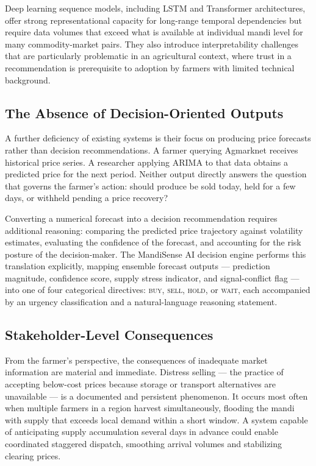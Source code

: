 \documentclass[12pt,a4paper]{report}
\begin{document}
Deep learning sequence models, including LSTM and Transformer architectures, offer strong representational capacity for long-range temporal dependencies but require data volumes that exceed what is available at individual mandi level for many commodity-market pairs. They also introduce interpretability challenges that are particularly problematic in an agricultural context, where trust in a recommendation is prerequisite to adoption by farmers with limited technical background.

\subsection{The Absence of Decision-Oriented Outputs}

A further deficiency of existing systems is their focus on producing price forecasts rather than decision recommendations. A farmer querying Agmarknet receives historical price series. A researcher applying ARIMA to that data obtains a predicted price for the next period. Neither output directly answers the question that governs the farmer's action: should produce be sold today, held for a few days, or withheld pending a price recovery?

Converting a numerical forecast into a decision recommendation requires additional reasoning: comparing the predicted price trajectory against volatility estimates, evaluating the confidence of the forecast, and accounting for the risk posture of the decision-maker. The MandiSense AI decision engine performs this translation explicitly, mapping ensemble forecast outputs — prediction magnitude, confidence score, supply stress indicator, and signal-conflict flag — into one of four categorical directives: \textsc{buy}, \textsc{sell}, \textsc{hold}, or \textsc{wait}, each accompanied by an urgency classification and a natural-language reasoning statement.

\subsection{Stakeholder-Level Consequences}

From the farmer's perspective, the consequences of inadequate market information are material and immediate. Distress selling — the practice of accepting below-cost prices because storage or transport alternatives are unavailable — is a documented and persistent phenomenon. It occurs most often when multiple farmers in a region harvest simultaneously, flooding the mandi with supply that exceeds local demand within a short window. A system capable of anticipating supply accumulation several days in advance could enable coordinated staggered dispatch, smoothing arrival volumes and stabilizing clearing prices.
\end{document}
